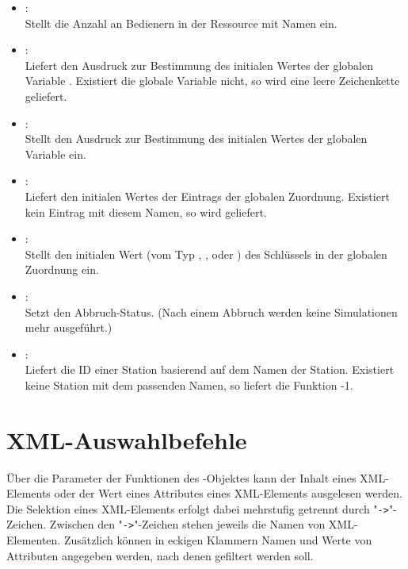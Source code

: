 \begin{itemize}
\item
{}:\\
Stellt die Anzahl an Bedienern in der Ressource mit Namen  ein.

\item
{}:\\
Liefert den Ausdruck zur Bestimmung des initialen Wertes der globalen Variable
. Existiert die globale Variable nicht, so wird
eine leere Zeichenkette geliefert.

\item
{}:\\
Stellt den Ausdruck zur Bestimmung des initialen Wertes der globalen Variable
 ein.

\item
{}:\\
Liefert den initialen Wertes der Eintrags  der globalen Zuordnung.
Existiert kein Eintrag mit diesem Namen, so wird  geliefert.

\item
{}:\\
Stellt den initialen Wert (vom Typ , ,  oder ) des Schlüssels 
in der globalen Zuordnung ein. 

\item
{}:\\
Setzt den Abbruch-Status. (Nach einem Abbruch werden keine Simulationen mehr ausgeführt.)

\item
{}:\\
Liefert die ID einer Station basierend auf dem Namen der Station.
Existiert keine Station mit dem passenden Namen, so liefert die Funktion -1.

\end{itemize}



\chapter{XML-Auswahlbefehle}

Über die Parameter der Funktionen des -Objektes kann der Inhalt eines XML-Elements oder der Wert eines
Attributes eines XML-Elements ausgelesen werden. Die Selektion eines XML-Elements erfolgt dabei mehrstufig
getrennt durch "\texttt{->}"-Zeichen. Zwischen den "\texttt{->}"-Zeichen stehen jeweils die Namen von XML-Elementen.
Zusätzlich können in eckigen Klammern Namen und Werte von Attributen angegeben werden, nach denen gefiltert werden soll.

